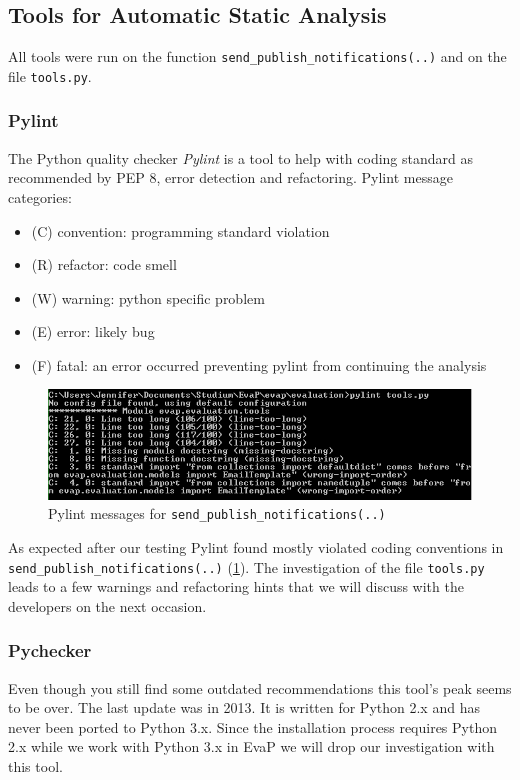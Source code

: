 \subsection{Tools for Automatic Static Analysis}
All tools were run on the function \texttt{send\_publish\_notifications(..)} and on the file \texttt{tools.py}.

\subsubsection{Pylint}
The Python quality checker \emph{Pylint} is a tool to help with coding standard as recommended by PEP 8, error detection and refactoring.
Pylint message categories:
\begin{itemize}
    \item (C) convention: programming standard violation
    \item (R) refactor: code smell
    \item (W) warning: python specific problem
    \item (E) error: likely bug
    \item (F) fatal: an error occurred preventing pylint from continuing the analysis
\end{itemize}
\begin{figure}[h]
    \centering
    \includegraphics[width=\textwidth, keepaspectratio]{graphics/pylint_send_publish_notifications_1}
    \caption{Pylint messages for \texttt{send\_publish\_notifications(..)}}
    \label{fig:pylint}
\end{figure} 
As expected after our testing Pylint found mostly violated coding conventions in \texttt{send\_publish\_notifications(..)} (\ref{fig:pylint}).
The investigation of the file \texttt{tools.py} leads to a few warnings and refactoring hints that we will discuss with the developers on the next occasion.

\subsubsection{Pychecker}
Even though you still find some outdated recommendations this tool's peak seems to be over. 
The last update was in 2013.
It is written for Python 2.x and has never been ported to Python 3.x.
Since the installation process requires Python 2.x while we work with Python 3.x in EvaP we will drop our investigation with this tool.

